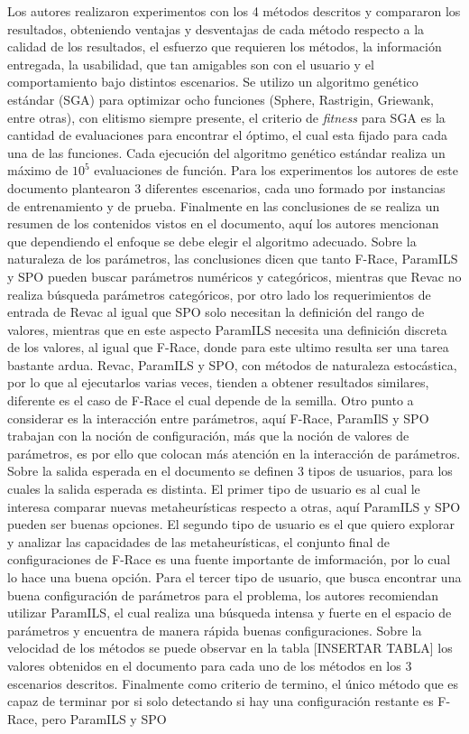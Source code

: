 \documentclass[letter, 10pt]{article}
\begin{document}
\begin{multicols}{2}
\begin{itemize}
\end{itemize}

Los autores realizaron experimentos con los 4 métodos descritos y compararon los resultados, obteniendo ventajas y desventajas de cada método respecto a la calidad de los resultados, el esfuerzo que requieren los métodos, la información entregada, la usabilidad, que tan amigables son con el usuario y el comportamiento bajo distintos escenarios. Se utilizo un algoritmo genético estándar (SGA) para optimizar ocho funciones (Sphere, Rastrigin, Griewank, entre otras), con elitismo siempre presente, el criterio de \textit{fitness} para SGA es la cantidad de evaluaciones para encontrar el óptimo, el cual esta fijado para cada una de las funciones. Cada ejecución del algoritmo genético estándar realiza un máximo de $10^{5}$ evaluaciones de función. Para los experimentos los autores de este documento plantearon 3 diferentes escenarios, cada uno formado por instancias de entrenamiento y de prueba. Finalmente en las conclusiones de \cite{Montero2014ABG} se realiza un resumen de los contenidos vistos en el documento, aquí los autores mencionan que dependiendo el enfoque se debe elegir el algoritmo adecuado. Sobre la naturaleza de los parámetros, las conclusiones dicen que tanto F-Race, ParamILS y SPO pueden buscar parámetros numéricos y categóricos, mientras que Revac no realiza búsqueda parámetros categóricos, por otro lado los requerimientos de entrada de Revac al igual que SPO solo necesitan la definición del rango de valores, mientras que en este aspecto ParamILS necesita una definición discreta de los valores, al igual que F-Race, donde para este ultimo resulta ser una tarea bastante ardua. Revac, ParamILS y SPO, con métodos de naturaleza estocástica, por lo que al ejecutarlos varias veces, tienden a obtener resultados similares, diferente es el caso de F-Race el cual depende de la semilla. Otro punto a considerar es la interacción entre parámetros, aquí F-Race, ParamIlS y SPO trabajan con la noción de configuración, más que la noción de valores de parámetros, es por ello que colocan más atención en la interacción de parámetros. Sobre la salida esperada en el documento se definen 3 tipos de usuarios, para los cuales la salida esperada es distinta. El primer tipo de usuario es al cual le interesa comparar nuevas metaheurísticas respecto a otras, aquí ParamILS y SPO pueden ser buenas opciones. El segundo tipo de usuario es el que quiero explorar y analizar las capacidades de las metaheurísticas, el conjunto final de configuraciones de F-Race es una fuente importante de imformación, por lo cual lo hace una buena opción. Para el tercer tipo de usuario, que busca encontrar una buena configuración de parámetros para el problema, los autores recomiendan utilizar ParamILS, el cual realiza una búsqueda intensa y fuerte en el espacio de parámetros y encuentra de manera rápida buenas configuraciones. Sobre la velocidad de los métodos se puede observar en la tabla [INSERTAR TABLA] los valores obtenidos en el documento para cada uno de los métodos en los 3 escenarios descritos. Finalmente como criterio de termino, el único método que es capaz de terminar por si solo detectando si hay una configuración restante es F-Race, pero ParamILS y SPO 
\end{multicols}
\end{document}
